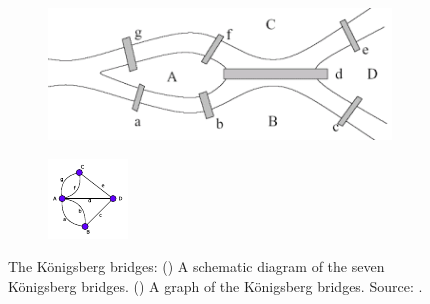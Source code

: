 \documentclass[10pt,a4paper]{article}
\theoremstyle{plain}
\theoremstyle{definition}
\begin{document}
\begin{figure}[!h]
	\centering
	\begin{subfigure}[b]{0.45\textwidth}
		\includegraphics[width=\textwidth]{images/koningsberg.png}
		\caption{}
		\label{kornbridge}
	\end{subfigure}
	\qquad
	\begin{subfigure}[b]{0.19\textwidth}
		\includegraphics[width=\textwidth]{images/bridge-graph.pdf}
		\caption{}
		\label{bridgegraph}
	\end{subfigure}
	\caption{The K\"{o}nigsberg bridges: () A schematic diagram of the seven K\"{o}nigsberg bridges. () A graph of the K\"{o}nigsberg bridges. Source: \citep{googleimages}. }
	\label{bridgeproblem}
\end{figure} 
\end{document}
